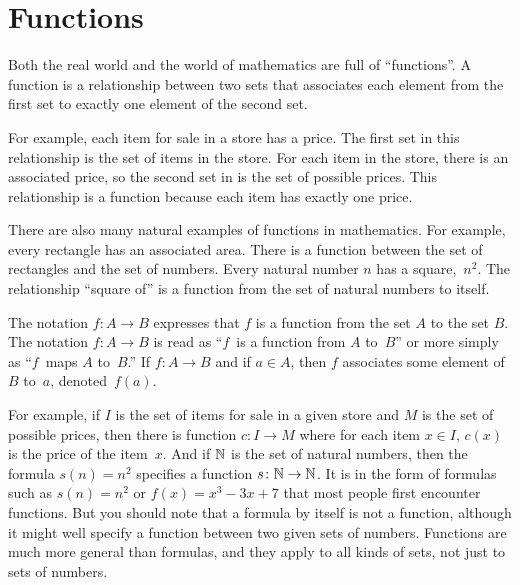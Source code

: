 \section{Functions}\label{S-sets-4}

Both the real world and the world of mathematics are full of ``functions''.
A function is a relationship between two sets that associates each element from the first set to exactly one element of the second set.  

For example, each item for sale in a store has a price.
The first set in this relationship is the set of items in the store.
For each item in the store, there is an associated price, so the
second set in is the set of possible prices.
This relationship is a function because each item has exactly one price.

There are also many natural examples of functions in mathematics.
For example, every rectangle has an associated area.
There is a function between the set of rectangles and the set of numbers.
Every natural number $n$ has a square,~$n^2$.
The relationship ``square of'' is a function from the set of natural numbers to itself.  

The notation $f\colon A\to B$ expresses that $f$ is a function from the set $A$ to the set $B$. 
The notation $f\colon A\to B$ is read as ``$f$~is a function from $A$ to~$B$'' or more simply as ``$f$~maps $A$ to~$B$.''
If $f\colon A\to B$ and if $a\in A$, then $f$ associates some element of $B$ to~$a$, denoted~$f(a)$.

For example, if $I$ is the set of items for sale in a given store and $M$ is the set of possible prices, then there is function $c\colon I\to M$ where for each item $x\in I$, $c(x)$ is the price of the item~$x$.
And if ${\mathbb N}$ is the set of natural numbers, then the formula $s(n) = n^2$ specifies a function $s\colon {\mathbb N}\to{\mathbb N}$.
It is in the form of formulas such as $s(n)=n^2$ or $f(x)=x^3-3x+7$ that most people first encounter functions.
But you should note that a formula by itself is not a function, although it might well specify a function between two given sets of numbers.
Functions are much more general than formulas, and they
apply to all kinds of sets, not just to sets of numbers.

\medbreak

